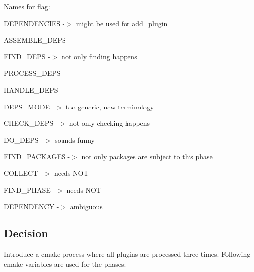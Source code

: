 Names for flag\+:


\begin{DoxyItemize}
\item {\ttfamily D\+E\+P\+E\+N\+D\+E\+N\+C\+I\+ES} -\/$>$ might be used for {\ttfamily add\+\_\+plugin}
\item {\ttfamily A\+S\+S\+E\+M\+B\+L\+E\+\_\+\+D\+E\+PS}
\item {\ttfamily F\+I\+N\+D\+\_\+\+D\+E\+PS} -\/$>$ not only finding happens
\item {\ttfamily P\+R\+O\+C\+E\+S\+S\+\_\+\+D\+E\+PS}
\item {\ttfamily H\+A\+N\+D\+L\+E\+\_\+\+D\+E\+PS}
\item {\ttfamily D\+E\+P\+S\+\_\+\+M\+O\+DE} -\/$>$ too generic, new terminology
\item {\ttfamily C\+H\+E\+C\+K\+\_\+\+D\+E\+PS} -\/$>$ not only checking happens
\item {\ttfamily D\+O\+\_\+\+D\+E\+PS} -\/$>$ sounds funny
\item {\ttfamily F\+I\+N\+D\+\_\+\+P\+A\+C\+K\+A\+G\+ES} -\/$>$ not only packages are subject to this phase
\item {\ttfamily C\+O\+L\+L\+E\+CT} -\/$>$ needs N\+OT
\item {\ttfamily F\+I\+N\+D\+\_\+\+P\+H\+A\+SE} -\/$>$ needs N\+OT
\item {\ttfamily D\+E\+P\+E\+N\+D\+E\+N\+CY} -\/$>$ ambiguous
\end{DoxyItemize}

\subsection*{Decision}

Introduce a cmake process where all plugins are processed three times. Following cmake variables are used for the phases\+:


